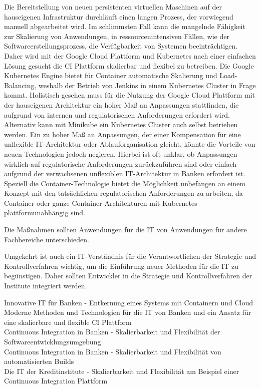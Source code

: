 Die Bereitstellung von neuen persistenten virtuellen Maschinen auf der hauseigenen Infrastruktur durchläuft einen langen Prozess, der vorwiegend manuell abgearbeitet wird. Im schlimmsten Fall kann die mangelnde Fähigkeit zur Skalierung von Anwendungen, in ressourcenintensiven Fällen, wie der Softwareerstellungsprozess, die Verfügbarkeit von Systemen beeinträchtigen. Daher wird mit der Google Cloud Plattform und Kubernetes nach einer einfachen Lösung gesucht die CI Plattform skalierbar und flexibel zu betreiben. Die Google Kubernetes Engine bietet für Container automatische Skalierung und Load-Balancing, weshalb der Betrieb von Jenkins in einem Kubernetes Cluster in Frage kommt. Holistisch gesehen muss für die Nutzung der Google Cloud Plattform mit der hauseigenen Architektur ein hoher Maß an Anpassungen stattfinden, die aufgrund von internen und regulatorischen Anforderungen erfordert wird. Alternativ kann mit Minikube ein Kubernetes Cluster auch selbst betrieben werden.
Ein zu hoher Maß an Anpassungen, der einer Kompensation für eine unflexible IT-Architektur oder Ablauforganisation gleicht, könnte die Vorteile von neuen Technologien jedoch negieren. Hierbei ist oft unklar, ob Anpassungen wirklich auf regulatorische Anforderungen zurückzuführen sind oder einfach aufgrund der verwachsenen unflexiblen IT-Architektur in Banken erfordert ist. Speziell die Container-Technologie bietet die Möglichkeit unbefangen an einem Konzept mit den tatsächlichen regulatorischen Anforderungen zu arbeiten, da Container oder ganze Container-Architekturen mit Kubernetes plattformunabhängig sind.


Die Maßnahmen sollten Anwendungen für die IT von Anwendungen für andere Fachbereiche unterschieden.

Umgekehrt ist auch ein IT-Verständnis für die Verantwortlichen der Strategie und Kontrollverfahren wichtig, um die Einführung neuer Methoden für die IT zu begünstigen. 
Daher sollten Entwickler in die Strategie und Kontrollverfahren der Institute integriert werden.


Innovative IT für Banken - Entkernung eines Systems mit Containern und Cloud\\
Moderne Methoden und Technologien für die IT von Banken und ein Ansatz für eine skalierbare und flexible CI Plattform \\
Continuous Integration in Banken - Skalierbarkeit und Flexibilität der Softwareentwicklungsumgebung\\
Continuous Integration in Banken - Skalierbarkeit und Flexibilität von automatisierten Builds\\
Die IT der Kreditinstitute - Skalierbarkeit und Flexibilität am Beispiel einer Continuous Integration Plattform
